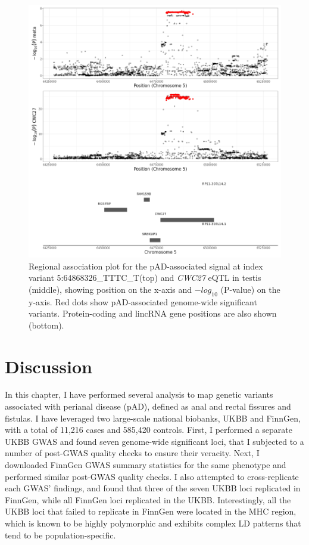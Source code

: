   \begin{figure}[H]
    \centering    
    \includegraphics[width=1.0\textwidth]{Vector/cwc27_testis.png}
    \caption[Figure]{Regional association plot for the pAD-associated signal at index variant 5:64868326\_TTTC\_T(top) and \textit{CWC27} eQTL in testis (middle), showing position on the x-axis and $-log_{10}$ (P-value) on the y-axis. Red dots show pAD-associated genome-wide significant variants. Protein-coding and lincRNA gene positions are also shown (bottom).}
    \label{fig:cwc27_testis}
    \end{figure}





\section{Discussion}
In this chapter, I have performed several analysis to map genetic variants associated with perianal disease (pAD), defined as anal and rectal fissures and fistulas. I have leveraged two large-scale national biobanks, UKBB and FinnGen, with a total of 11,216 cases and 585,420 controls. First, I performed a separate UKBB GWAS and found seven genome-wide significant loci, that I subjected to a number of post-GWAS quality checks to ensure their veracity. Next, I downloaded FinnGen GWAS summary statistics for the same phenotype and performed similar post-GWAS quality checks. I also attempted to cross-replicate each GWAS' findings, and found that three of the seven UKBB loci replicated in FinnGen, while all FinnGen loci replicated in the UKBB. Interestingly, all the UKBB loci that failed to replicate in FinnGen were located in the MHC region, which is known to be highly polymorphic and exhibits complex LD patterns that tend to be population-specific. \\

